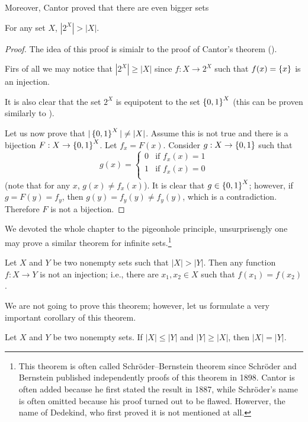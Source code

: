 Moreover, Cantor proved that there are even bigger sets
\begin{theorem}
  For any set $X$, $|2^X| > |X|$.
\end{theorem}
\begin{proof}
  The idea of this proof is simialr to the proof of Cantor's theorem
  (). 
  
  Firs of all we may notice that $|2^X| \ge |X|$ since $f : X \to 2^X$ such that
  $f(x) = \set{x}$ is an injection.
  
  It is also clear that the set $2^X$ is equipotent to the set $\set{0, 1}^X$
  (this can be proven similarly to ).

  Let us now prove that $|\set{0, 1}^X| \neq |X|$. Assume this is not true and
  there is a bijection $F : X \to \set{0, 1}^X$. Let $f_x = F(x)$.
  Consider $g : X \to \set{0, 1}$ such that 
  \[
    g(x) = 
    \begin{cases}
      0 & \text{if } f_x(x) = 1 \\
      1 & \text{if } f_x(x) = 0 \\
    \end{cases}
  \]
  (note that for any $x$, $g(x) \neq f_x(x)$). It is clear that
  $g \in \set{0, 1}^X$; however, if $g = F(y) = f_y$, then $g(y) = f_y(y) \neq
  f_y(y)$, which is a contradiction. Therefore $F$ is not a bijection.
\end{proof}

We devoted the whole chapter to the pigeonhole principle, unsurprisengly one may
prove a similar theorem for infinite sets.\footnote{%
  This theorem is often called Schr\"{o}der--Bernstein theorem since Schr\"{o}der
  and Bernstein published independently proofs of this theorem in 1898. Cantor
  is often added because he first stated the result in 1887, while
  Schr\"{o}der's name is often omitted because his proof turned out to be
  flawed. Howerver, the name of Dedekind, who first proved it is not mentioned
  at all.
}
\begin{theorem}
  Let $X$ and $Y$ be two nonempty sets such that $|X| > |Y|$. Then any function
  $f : X \to Y$ is not an injection; i.e., there are $x_1, x_2 \in X$ such that
  $f(x_1) = f(x_2)$.
\end{theorem}


We are not going to prove this theorem; however, let us formulate a very
important corollary of this theorem.
\begin{corollary}
\label{corollary:schroder-bernstein}
  Let $X$ and $Y$ be two nonempty sets. If $|X| \le |Y|$ and $|Y| \ge |X|$, then
  $|X| = |Y|$.
\end{corollary}

